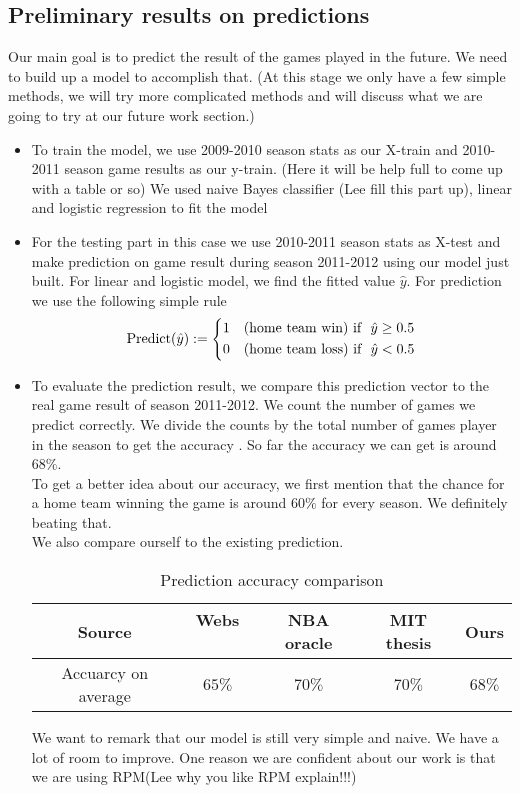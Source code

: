 \documentclass[11pt]{article}
\begin{document}
\subsection{Preliminary results on predictions}
Our main goal is to predict the result of the games played in the future. We need to build up a model to accomplish that.  
(At this stage we only have a few simple methods, we will try more complicated methods and will discuss what we are going to try at our
future work section.)\\
\begin{itemize}
\item
To train the model, we use 2009-2010 season stats as our X-train and 2010-2011 season game results as our y-train.
(Here it will be help full to come up with a table or so) 
We used naive Bayes classifier (Lee fill this part up), linear and logistic regression to fit the model
\item For the testing part in this case we use 2010-2011 season stats as X-test and make prediction on game result during season 2011-2012 using our model just built.
For linear and logistic model, we find the fitted value $\hat y$. For prediction we use the following simple rule
$$ \text{Predict}(\hat y) :=\begin{dcases} 1 \ \ \ \text{(home team win) if  \  $\hat y \ge 0.5$} \\
     0 \ \ \ \text{(home team loss) if  \ $\hat y < 0.5$}
      \end{dcases}
$$
\item To evaluate the prediction result, we compare this prediction vector to the real  game result of season 2011-2012. We count the number of games we predict correctly. 
We divide the counts by the total number of games player in the season to get the accuracy . So far the accuracy we can get is around $68\%$. \\
To get a better idea about our accuracy, we first mention that the chance for a  home team winning the game is around $60\%$ for every season. We definitely beating that.\\  
We also compare ourself to the existing prediction.

\begin{table}[ht]
\caption{Prediction accuracy comparison} %
\centering %
\begin{tabular}{c c c c c} %
\hline\hline %
Source & Webs \ \ & NBA oracle & MIT thesis & Ours  \\ [0.5ex] %
\hline %
Accuarcy on average& $65\%$ & $70\%$ &$70\%$&  $68\%$ \\
 [1ex] %
\hline %
\end{tabular}
\label{table:nonlin} %
\end{table}

We want to remark that our model is still very simple and naive. We have a lot of room to improve. 
One reason we are confident about our work is that we are using RPM(Lee why you like RPM explain!!!) 
\end{itemize}
\end{document}
